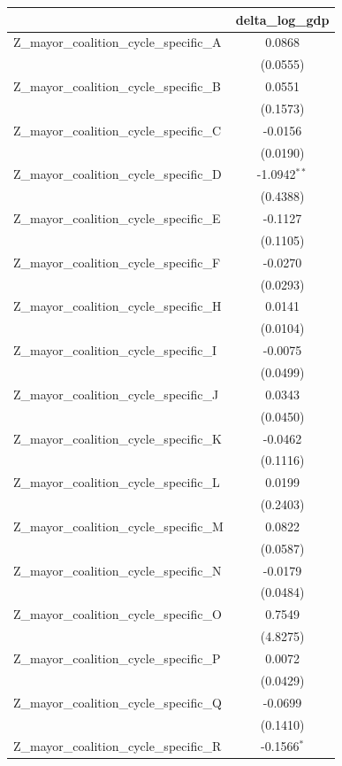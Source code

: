 \begin{tabular}{lc}
\toprule
 & delta\_log\_gdp \\
\midrule
Z\_mayor\_coalition\_cycle\_specific\_A & 0.0868 \\
 & (0.0555) \\
Z\_mayor\_coalition\_cycle\_specific\_B & 0.0551 \\
 & (0.1573) \\
Z\_mayor\_coalition\_cycle\_specific\_C & -0.0156 \\
 & (0.0190) \\
Z\_mayor\_coalition\_cycle\_specific\_D & -1.0942$^{**}$ \\
 & (0.4388) \\
Z\_mayor\_coalition\_cycle\_specific\_E & -0.1127 \\
 & (0.1105) \\
Z\_mayor\_coalition\_cycle\_specific\_F & -0.0270 \\
 & (0.0293) \\
Z\_mayor\_coalition\_cycle\_specific\_H & 0.0141 \\
 & (0.0104) \\
Z\_mayor\_coalition\_cycle\_specific\_I & -0.0075 \\
 & (0.0499) \\
Z\_mayor\_coalition\_cycle\_specific\_J & 0.0343 \\
 & (0.0450) \\
Z\_mayor\_coalition\_cycle\_specific\_K & -0.0462 \\
 & (0.1116) \\
Z\_mayor\_coalition\_cycle\_specific\_L & 0.0199 \\
 & (0.2403) \\
Z\_mayor\_coalition\_cycle\_specific\_M & 0.0822 \\
 & (0.0587) \\
Z\_mayor\_coalition\_cycle\_specific\_N & -0.0179 \\
 & (0.0484) \\
Z\_mayor\_coalition\_cycle\_specific\_O & 0.7549 \\
 & (4.8275) \\
Z\_mayor\_coalition\_cycle\_specific\_P & 0.0072 \\
 & (0.0429) \\
Z\_mayor\_coalition\_cycle\_specific\_Q & -0.0699 \\
 & (0.1410) \\
Z\_mayor\_coalition\_cycle\_specific\_R & -0.1566$^{*}$ \\

\end{tabular}
